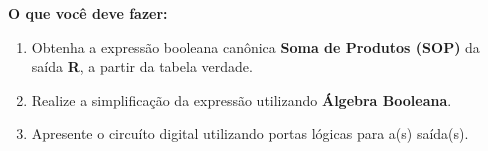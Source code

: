 \documentclass[12pt]{article}
\begin{document}
\bigskip

\noindent\textbf{O que você deve fazer:}

\begin{enumerate}[label=\textbf{\alph*)}, leftmargin=2cm]
  \item Obtenha a expressão booleana canônica \textbf{Soma de Produtos (SOP)} 
        da saída \textbf{R}, a partir da tabela verdade.
  \item Realize a simplificação da expressão utilizando \textbf{Álgebra Booleana}.
  \item Apresente o circuíto digital utilizando portas lógicas para a(s) saída(s).
\end{enumerate}
\end{document}

